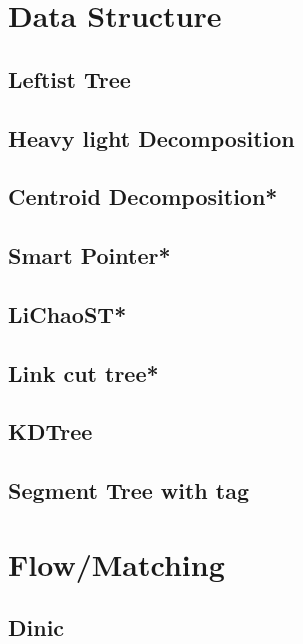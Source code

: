 \section{Data Structure}
\subsection{Leftist Tree}

\subsection{Heavy light Decomposition}

\subsection{Centroid Decomposition*} %

\subsection{Smart Pointer*}

\subsection{LiChaoST*}

\subsection{Link cut tree*} %

\subsection{KDTree}

\subsection{Segment Tree with tag}



\section{Flow/Matching}
\subsection{Dinic}


